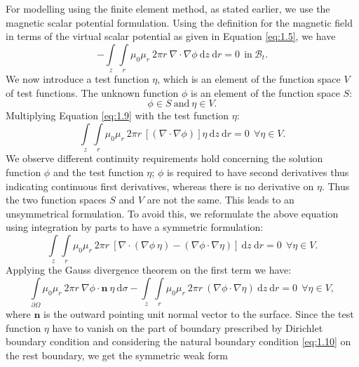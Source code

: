 \documentclass[11pt,a4paper,final]{article}
\begin{document}
For modelling using the finite element method, as stated earlier, we use the magnetic scalar potential formulation. Using the definition for the magnetic field in terms of the virtual scalar potential as given in Equation \eqref{eq:1.5}, we have
\begin{equation}
-\int\limits_{z} \int\limits_{r} \mu_0 \mu_r \ 2 \pi r \ \nabla \cdot \nabla \phi \ \mathrm{d}z \ \mathrm{d}r = 0 \ \ \text{in} \ \mathcal{B}_t.
\label{eq:1.9}
\end{equation}
We now introduce a test function $\eta$, which is an element of the function space $V$ of test functions. The unknown function $\phi$ is an element of the function space $S$:
\begin{equation}
\phi \in S \ \text{and} \ \eta \in V.
\end{equation}
Multiplying Equation \eqref{eq:1.9} with the test function $\eta$:
\begin{equation}
\int\limits_{z} \int\limits_{r} \mu_0 \mu_r \ 2 \pi r \ [(\nabla \cdot \nabla \phi)] \eta \ \mathrm{d}z \ \mathrm{d}r = 0 \ \ \forall \eta \in V.
\end{equation}
We observe different continuity requirements hold concerning the solution function $\phi$ and the test function $\eta$; $\phi$ is required to have second derivatives thus indicating continuous first derivatives, whereas there is no derivative on $\eta$. Thus the two function spaces $S$ and $V$ are not the same. This leads to an unsymmetrical formulation. To avoid this, we reformulate the above equation using integration by parts to have a symmetric formulation:
\begin{equation}
\int\limits_{z} \int\limits_{r} \mu_0 \mu_r \ 2 \pi r \ [ \nabla \cdot (\nabla\phi \ \eta) - (\nabla \phi \cdot \nabla \eta) ] \ \mathrm{d}z \ \mathrm{d}r = 0 \ \ \forall \eta \in V.
\end{equation}
Applying the Gauss divergence theorem on the first term we have:
\begin{equation}
\int\limits_{\partial \Omega} \mu_0 \mu_r \ 2 \pi r \ \nabla \phi \cdot \mathbf{n} \ \eta \ \mathrm{d}\sigma - \int\limits_{z} \int\limits_{r} \mu_0 \mu_r \ 2 \pi r \ (\nabla \phi \cdot \nabla \eta) \ \mathrm{d}z \ \mathrm{d}r = 0 \ \ \forall \eta \in V,
\end{equation}
where $\mathbf{n}$ is the outward pointing unit normal vector to the surface. Since the test function $\eta$ have to vanish on the part of boundary prescribed by Dirichlet boundary condition and considering the natural boundary condition \eqref{eq:1.10} on the rest boundary, we get the symmetric weak form
\end{document}
